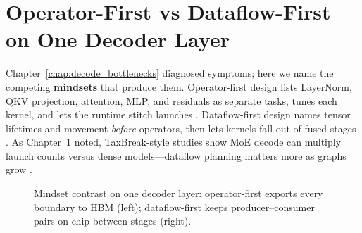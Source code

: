 \section{Operator-First vs Dataflow-First on One Decoder Layer}
\label{sec:two_mindsets}

Chapter~\ref{chap:decode_bottlenecks} diagnosed symptoms; here we name the competing \textbf{mindsets} that produce them.
Operator-first design lists LayerNorm, QKV projection, attention, MLP, and residuals as separate tasks, tunes each kernel, and lets the runtime stitch launches \citep{dao2023flashdecoding}.
Dataflow-first design names tensor lifetimes and movement \emph{before} operators, then lets kernels fall out of fused stages \citep{sun2019powerdrivendnndata,yirage2026}.
As Chapter~1 noted, TaxBreak-style studies show MoE decode can multiply launch counts versus dense models---dataflow planning matters more as graphs grow \citep{taxbreak2026,liu2024deepseekv3}.

\begin{figure}[t]
\centering
{}
\caption{Mindset contrast on one decoder layer: operator-first exports every boundary to HBM (left); dataflow-first keeps producer--consumer pairs on-chip between stages (right).}
\label{fig:mindset_contrast}
\end{figure}

